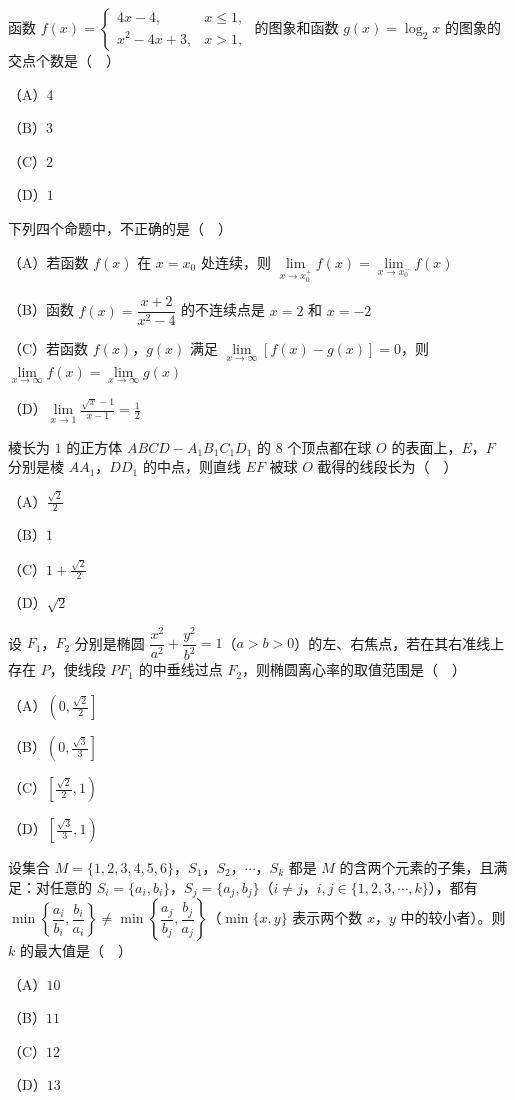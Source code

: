 \begin{question}
函数 $f(x)=\begin{cases}4x-4,&x\leqslant1,\\ x^2-4x+3,&x>1,\end{cases}$ 的图象和函数 $g(x)=\log_2x$ 的图象的交点个数是（　）

（A）$4$

（B）$3$

（C）$2$

（D）$1$

\end{question}
\begin{question}
下列四个命题中，不正确的是（　）

（A）若函数 $f(x)$ 在 $x=x_0$ 处连续，则 $\lim\limits_{x\to x_0^+}f(x)=\lim\limits_{x\to x_0^-}f(x)$

（B）函数 $f(x)=\dfrac{x+2}{x^2-4}$ 的不连续点是 $x=2$ 和 $x=-2$

（C）若函数 $f(x)$，$g(x)$ 满足 $\lim\limits_{x\to\infty}[f(x)-g(x)]=0$，则 $\lim\limits_{x\to\infty}f(x)=\lim\limits_{x\to\infty}g(x)$

（D）$\lim\limits_{x\to1}\frac{\sqrt x-1}{x-1}=\frac12$

\end{question}
\begin{question}
棱长为 $1$ 的正方体 $ABCD-A_1B_1C_1D_1$ 的 $8$ 个顶点都在球 $O$ 的表面上，$E$，$F$ 分别是棱 $AA_1$，$DD_1$ 的中点，则直线 $EF$ 被球 $O$ 截得的线段长为（　）

（A）$\frac{\sqrt2}2$

（B）$1$

（C）$1+\frac{\sqrt2}2$

（D）$\sqrt2$

\end{question}
\begin{question}
设 $F_1$，$F_2$ 分别是椭圆 $\dfrac{x^2}{a^2}+\dfrac{y^2}{b^2}=1$（$a>b>0$）的左、右焦点，若在其右准线上存在 $P$，使线段 $PF_1$ 的中垂线过点 $F_2$，则椭圆离心率的取值范围是（　）

（A）$\left(0,\frac{\sqrt2}2\right]$

（B）$\left(0,\frac{\sqrt3}3\right]$

（C）$\left[\frac{\sqrt2}2,1\right)$

（D）$\left[\frac{\sqrt3}3,1\right)$

\end{question}
\begin{question}
设集合 $M=\{1,2,3,4,5,6\}$，$S_1$，$S_2$，$\cdots$，$S_k$ 都是 $M$ 的含两个元素的子集，且满足：对任意的 $S_i=\{a_i,b_i\}$，$S_j=\{a_j,b_j\}$（$i\neq j$，$i,j\in\{1,2,3,\cdots,k\}$），都有 $\min\left\{\dfrac{a_i}{b_i},\dfrac{b_i}{a_i}\right\}\neq\min\left\{\dfrac{a_j}{b_j},\dfrac{b_j}{a_j}\right\}$（$\min\{x,y\}$ 表示两个数 $x$，$y$ 中的较小者）。则 $k$ 的最大值是（　）

（A）$10$

（B）$11$

（C）$12$

（D）$13$

\end{question}

